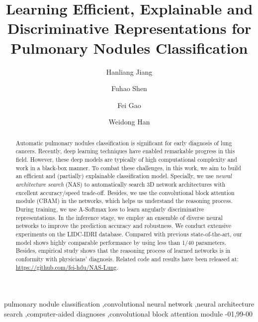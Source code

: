 \documentclass[final,5p,times,twocolumn]{elsarticle}
\begin{document}
\begin{frontmatter}

\title{Learning Efficient, Explainable and Discriminative Representations for Pulmonary Nodules Classification}




\author[mymainaddress]{Hanliang Jiang}


\author[mysecondaryaddress]{Fuhao Shen}
\author[mysecondaryaddress]{Fei Gao}



\author[mythirdaddress]{Weidong Han}


\address[mymainaddress]{Pulmonary and Critical Care Medicine, Sir Run Run Shaw Hospital, 
School of Medicine, Zhejiang University, Hangzhou 310020, China.}
\address[mysecondaryaddress]{School of Computer Science and Technology, Hangzhou Dianzi University, Hangzhou 310018, China.}
\address[mythirdaddress]{Department of Medical Oncology, Sir Run Run Shaw Hospital, College of Medicine, Zhejiang University, Hangzhou, Zhejiang 310016, China.}

\begin{abstract}
Automatic pulmonary nodules classification is significant for early diagnosis of lung cancers. Recently, deep learning techniques have enabled remarkable progress in this field. However, these deep models are typically of high computational complexity and work in a black-box manner. 
To combat these challenges, in this work, we aim to build an efficient and (partially) explainable classification model. Specially, we use \emph{neural architecture search} (NAS) to automatically search 3D network architectures with excellent accuracy/speed trade-off. Besides, we use the convolutional block attention module (CBAM) in the networks, which helps us understand the reasoning process. 
During training, we use A-Softmax loss to learn angularly discriminative representations. 
In the inference stage, we employ an ensemble of diverse neural networks to improve the prediction accuracy and robustness. 
We conduct extensive experiments on the LIDC-IDRI database. Compared with previous state-of-the-art, our model shows highly comparable performance by using less than 1/40 parameters. Besides, empirical study shows that the reasoning process of learned networks is in conformity with physicians' diagnosis. Related code and results have been released at: \url{https://github.com/fei-hdu/NAS-Lung}.
\end{abstract}

\begin{keyword}
pulmonary nodule classification \sep convolutional neural network \sep neural architecture search \sep computer-aided diagnoses \sep convolutional block attention module
-01\sep  99-00
\end{keyword}

\end{frontmatter}
\end{document}
